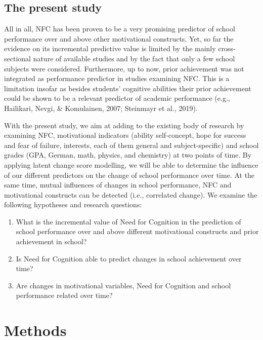 \documentclass[
  man]{apa6}
\providecommand{\tightlist}{%
  \setlength{\itemsep}{0pt}\setlength{\parskip}{0pt}}
\begin{document}
\hypertarget{the-present-study}{%
\subsection{The present study}\label{the-present-study}}

All in all, NFC has been proven to be a very promising predictor of school performance over and above other motivational constructs. Yet, so far the evidence on its incremental predictive value is limited by the mainly cross-sectional nature of available studies and by the fact that only a few school subjects were considered. Furthermore, up to now, prior achievement was not integrated as performance predictor in studies examining NFC. This is a limitation insofar as besides students' cognitive abilities their prior achievement could be shown to be a relevant predictor of academic performance (e.g., Hailikari, Nevgi, \& Komulainen, 2007; Steinmayr et al., 2019).

With the present study, we aim at adding to the existing body of research by examining NFC, motivational indicators (ability self-concept, hope for success and fear of failure, interests, each of them general and subject-specific) and school grades (GPA, German, math, physics, and chemistry) at two points of time. By applying latent change score modelling, we will be able to determine the influence of our different predictors on the change of school performance over time. At the same time, mutual influences of changes in school performance, NFC and motivational constructs can be detected (i.e., correlated change). We examine the following hypotheses and research questions:

\begin{enumerate}
\def\labelenumi{\arabic{enumi}.}
\tightlist
\item
  What is the incremental value of Need for Cognition in the prediction of school performance over and above different motivational constructs and prior achievement in school?
\item
  Is Need for Cognition able to predict changes in school achievement over time?
\item
  Are changes in motivational variables, Need for Cognition and school performance related over time?
\end{enumerate}

\hypertarget{methods}{%
\section{Methods}\label{methods}}
\end{document}
